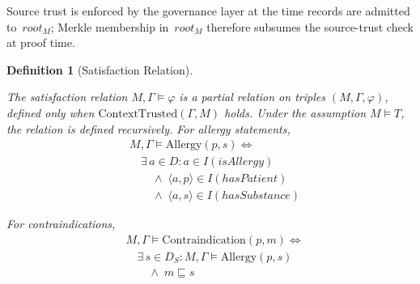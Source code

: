 \documentclass[journal]{IEEEtran}
\newtheorem{definition}{Definition}
\begin{document}
Source trust is enforced by the governance layer at the time records
are admitted to~$\mathit{root}_M$; Merkle membership in~$\mathit{root}_M$
therefore subsumes the source-trust check at proof time.

\begin{definition}[Satisfaction Relation]
\label{def:satisfaction}

The satisfaction relation $M, \Gamma \models \varphi$ is a partial relation on triples $(M, \Gamma, \varphi)$, defined only when $\mathrm{ContextTrusted}(\Gamma, M)$ holds. Under the assumption $M \models T$, the relation is defined recursively. For allergy statements,
\begin{equation}
\begin{aligned}
  & M, \Gamma \models \mathrm{Allergy}(p, s) \iff \\
  & \quad \exists\, a \in D :
      a \in I(\mathit{isAllergy}) \\
  & \qquad \wedge\; \langle a, p \rangle \in I(\mathit{hasPatient}) \\
  & \qquad \wedge\; \langle a, s \rangle \in I(\mathit{hasSubstance})
\end{aligned}
\label{eq:sat-allergy}
\end{equation}

For contraindications,
\begin{equation}
\begin{aligned}
  & M, \Gamma \models \mathrm{Contraindication}(p, m) \iff \\
  & \quad \exists\, s \in D_S :
      M, \Gamma \models \mathrm{Allergy}(p, s) \\
  & \qquad \wedge\; m \sqsubseteq s
\end{aligned}
\label{eq:sat-contra}
\end{equation}


\end{definition}
\end{document}
